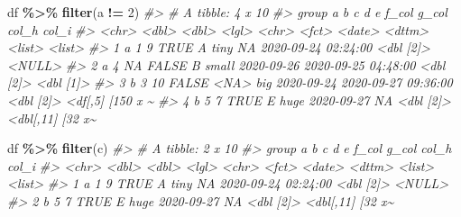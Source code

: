 \documentclass[
]{report}
\newenvironment{Shaded}{\begin{snugshade}}{\end{snugshade}}
\newcommand{\CommentTok}[1]{\textcolor[rgb]{0.56,0.35,0.01}{\textit{#1}}}
\newcommand{\DecValTok}[1]{\textcolor[rgb]{0.00,0.00,0.81}{#1}}
\newcommand{\KeywordTok}[1]{\textcolor[rgb]{0.13,0.29,0.53}{\textbf{#1}}}
\newcommand{\NormalTok}[1]{#1}
\newcommand{\OperatorTok}[1]{\textcolor[rgb]{0.81,0.36,0.00}{\textbf{#1}}}
\newcommand{\StringTok}[1]{\textcolor[rgb]{0.31,0.60,0.02}{#1}}
\begin{document}
\begin{Shaded}
\begin{Highlighting}[]
\NormalTok{df }\OperatorTok{\%\textgreater{}\%}
\StringTok{  }\KeywordTok{filter}\NormalTok{(a }\OperatorTok{!=}\StringTok{ }\DecValTok{2}\NormalTok{)}
\CommentTok{\#\textgreater{} \# A tibble: 4 x 10}
\CommentTok{\#\textgreater{}   group     a     b c     d     e     f\_col      g\_col               col\_h     col\_i           }
\CommentTok{\#\textgreater{}   \textless{}chr\textgreater{} \textless{}dbl\textgreater{} \textless{}dbl\textgreater{} \textless{}lgl\textgreater{} \textless{}chr\textgreater{} \textless{}fct\textgreater{} \textless{}date\textgreater{}     \textless{}dttm\textgreater{}              \textless{}list\textgreater{}    \textless{}list\textgreater{}          }
\CommentTok{\#\textgreater{} 1 a         1     9 TRUE  A     tiny  NA         2020{-}09{-}24 02:24:00 \textless{}dbl [2]\textgreater{} \textless{}NULL\textgreater{}          }
\CommentTok{\#\textgreater{} 2 a         4    NA FALSE B     small 2020{-}09{-}26 2020{-}09{-}25 04:48:00 \textless{}dbl [2]\textgreater{} \textless{}dbl [1]\textgreater{}       }
\CommentTok{\#\textgreater{} 3 b         3    10 FALSE \textless{}NA\textgreater{}  big   2020{-}09{-}24 2020{-}09{-}27 09:36:00 \textless{}dbl [2]\textgreater{} \textless{}df[,5] [150 x \textasciitilde{}}
\CommentTok{\#\textgreater{} 4 b         5     7 TRUE  E     huge  2020{-}09{-}27 NA                  \textless{}dbl [2]\textgreater{} \textless{}dbl[,11] [32 x\textasciitilde{}}
\end{Highlighting}
\end{Shaded}

\begin{Shaded}
\begin{Highlighting}[]
\NormalTok{df }\OperatorTok{\%\textgreater{}\%}
\StringTok{  }\KeywordTok{filter}\NormalTok{(c)}
\CommentTok{\#\textgreater{} \# A tibble: 2 x 10}
\CommentTok{\#\textgreater{}   group     a     b c     d     e     f\_col      g\_col               col\_h     col\_i           }
\CommentTok{\#\textgreater{}   \textless{}chr\textgreater{} \textless{}dbl\textgreater{} \textless{}dbl\textgreater{} \textless{}lgl\textgreater{} \textless{}chr\textgreater{} \textless{}fct\textgreater{} \textless{}date\textgreater{}     \textless{}dttm\textgreater{}              \textless{}list\textgreater{}    \textless{}list\textgreater{}          }
\CommentTok{\#\textgreater{} 1 a         1     9 TRUE  A     tiny  NA         2020{-}09{-}24 02:24:00 \textless{}dbl [2]\textgreater{} \textless{}NULL\textgreater{}          }
\CommentTok{\#\textgreater{} 2 b         5     7 TRUE  E     huge  2020{-}09{-}27 NA                  \textless{}dbl [2]\textgreater{} \textless{}dbl[,11] [32 x\textasciitilde{}}
\end{Highlighting}
\end{Shaded}
\end{document}
